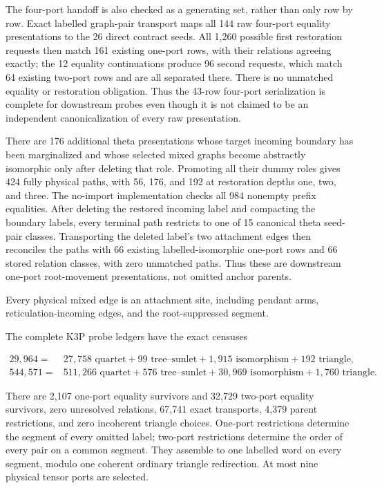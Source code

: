 The four-port handoff is also checked as a generating set, rather than only
row by row.  Exact labelled graph-pair transport maps all 144 raw four-port
equality presentations to the 26 direct contract seeds.  All 1,260 possible
first restoration requests then match 161 existing one-port rows, with their
relations agreeing exactly; the 12 equality continuations produce 96 second
requests, which match 64 existing two-port rows and are all separated there.
There is no unmatched equality or restoration obligation.  Thus the 43-row
four-port serialization is complete for downstream probes even though it is
not claimed to be an independent canonicalization of every raw presentation.

There are 176 additional theta presentations whose target incoming boundary
has been marginalized and whose selected mixed graphs become abstractly
isomorphic only after deleting that role.  Promoting all their dummy roles
gives 424 fully physical paths, with 56, 176, and 192 at restoration depths
one, two, and three.  The no-import implementation checks all 984 nonempty
prefix equalities.  After deleting the restored incoming label and compacting
the boundary labels, every terminal path restricts to one of 15 canonical
theta seed-pair classes.  Transporting the deleted label's two attachment
edges then reconciles the paths with 66 existing labelled-isomorphic one-port
rows and 66 stored relation classes, with zero unmatched paths.  Thus these
are downstream one-port root-movement presentations, not omitted anchor
parents.

Every physical mixed edge is an attachment site, including pendant arms,
reticulation-incoming edges, and the root-suppressed segment.

\begin{proposition}\label{prop:probes}
The complete K3P probe ledgers have the exact censuses

\begin{align*}
29{,}964={}&27{,}758\text{ quartet}+99\text{ tree--sunlet}
 +1{,}915\text{ isomorphism}+192\text{ triangle},\\
544{,}571={}&511{,}266\text{ quartet}+576\text{ tree--sunlet}
 +30{,}969\text{ isomorphism}+1{,}760\text{ triangle}.
\end{align*}

There are 2,107 one-port equality survivors and 32,729 two-port
equality survivors, zero unresolved relations, 67,741 exact transports,
4,379 parent restrictions, and zero incoherent triangle choices.
One-port restrictions determine the segment of every omitted label; two-port
restrictions determine the order of every pair on a common segment.  They
assemble to one labelled word on every segment, modulo one coherent ordinary
triangle redirection.  At most nine physical tensor ports are selected.
\end{proposition}

